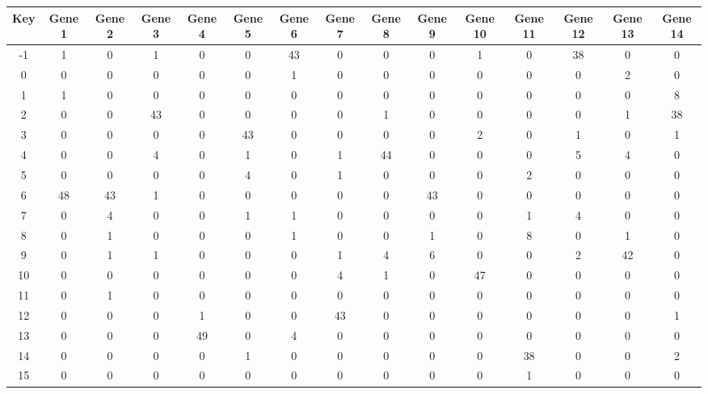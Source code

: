 \begin{tabular}{|c|c|c|c|c|c|c|c|c|c|c|c|c|c|c|}
\hline
Key & Gene 1 & Gene 2 & Gene 3 & Gene 4 & Gene 5 & Gene 6 & Gene 7 & Gene 8 & Gene 9 & Gene 10 & Gene 11 & Gene 12 & Gene 13 & Gene 14 \\
\hline
-1 & 1 & 0 & 1 & 0 & 0 & 43 & 0 & 0 & 0 & 1 & 0 & 38 & 0 & 0 \\
0 & 0 & 0 & 0 & 0 & 0 & 1 & 0 & 0 & 0 & 0 & 0 & 0 & 2 & 0 \\
1 & 1 & 0 & 0 & 0 & 0 & 0 & 0 & 0 & 0 & 0 & 0 & 0 & 0 & 8 \\
2 & 0 & 0 & 43 & 0 & 0 & 0 & 0 & 1 & 0 & 0 & 0 & 0 & 1 & 38 \\
3 & 0 & 0 & 0 & 0 & 43 & 0 & 0 & 0 & 0 & 2 & 0 & 1 & 0 & 1 \\
4 & 0 & 0 & 4 & 0 & 1 & 0 & 1 & 44 & 0 & 0 & 0 & 5 & 4 & 0 \\
5 & 0 & 0 & 0 & 0 & 4 & 0 & 1 & 0 & 0 & 0 & 2 & 0 & 0 & 0 \\
6 & 48 & 43 & 1 & 0 & 0 & 0 & 0 & 0 & 43 & 0 & 0 & 0 & 0 & 0 \\
7 & 0 & 4 & 0 & 0 & 1 & 1 & 0 & 0 & 0 & 0 & 1 & 4 & 0 & 0 \\
8 & 0 & 1 & 0 & 0 & 0 & 1 & 0 & 0 & 1 & 0 & 8 & 0 & 1 & 0 \\
9 & 0 & 1 & 1 & 0 & 0 & 0 & 1 & 4 & 6 & 0 & 0 & 2 & 42 & 0 \\
10 & 0 & 0 & 0 & 0 & 0 & 0 & 4 & 1 & 0 & 47 & 0 & 0 & 0 & 0 \\
11 & 0 & 1 & 0 & 0 & 0 & 0 & 0 & 0 & 0 & 0 & 0 & 0 & 0 & 0 \\
12 & 0 & 0 & 0 & 1 & 0 & 0 & 43 & 0 & 0 & 0 & 0 & 0 & 0 & 1 \\
13 & 0 & 0 & 0 & 49 & 0 & 4 & 0 & 0 & 0 & 0 & 0 & 0 & 0 & 0 \\
14 & 0 & 0 & 0 & 0 & 1 & 0 & 0 & 0 & 0 & 0 & 38 & 0 & 0 & 2 \\
15 & 0 & 0 & 0 & 0 & 0 & 0 & 0 & 0 & 0 & 0 & 1 & 0 & 0 & 0 \\
\hline
\end{tabular}